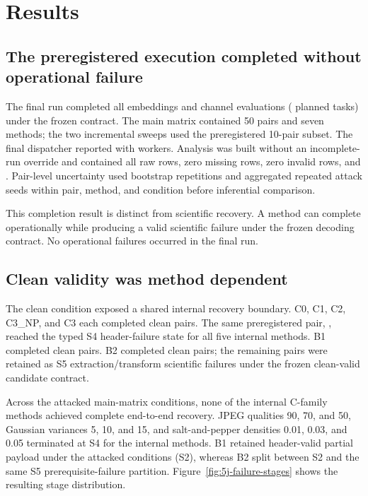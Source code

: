 \section{Results}

\subsection{The preregistered execution completed without operational failure}

The final run completed all \FinalEmbeddings{} embeddings and \FinalEvaluations{} channel evaluations (\FinalTasks{} planned tasks) under the frozen  contract. The main matrix contained 50 pairs and seven methods; the two incremental sweeps used the preregistered 10-pair subset. The final dispatcher reported  with \FinalWorkers{} workers. Analysis was built without an incomplete-run override and contained all \FinalEvaluations{} raw rows, zero missing rows, zero invalid rows, and . Pair-level uncertainty used \FinalBootstrap{} bootstrap repetitions and aggregated repeated attack seeds within pair, method, and condition before inferential comparison.

This completion result is distinct from scientific recovery. A method can complete operationally while producing a valid scientific failure under the frozen decoding contract. No operational failures occurred in the final run.

\subsection{Clean validity was method dependent}

The clean condition exposed a shared internal recovery boundary. C0, C1, C2, C3\_NP, and C3 each completed \InternalCleanComplete{} clean pairs. The same preregistered pair, , reached the typed S4 header-failure state for all five internal methods. B1 completed \BOneCleanComplete{} clean pairs. B2 completed \BTwoCleanComplete{} clean pairs; the remaining pairs were retained as S5 extraction/transform scientific failures under the frozen clean-valid candidate contract.

Across the attacked main-matrix conditions, none of the internal C-family methods achieved complete end-to-end recovery. JPEG qualities 90, 70, and 50, Gaussian variances 5, 10, and 15, and salt-and-pepper densities 0.01, 0.03, and 0.05 terminated at S4 for the internal methods. B1 retained header-valid partial payload under the attacked conditions (S2), whereas B2 split between S2 and the same S5 prerequisite-failure partition. Figure~\ref{fig:5j-failure-stages} shows the resulting stage distribution.

